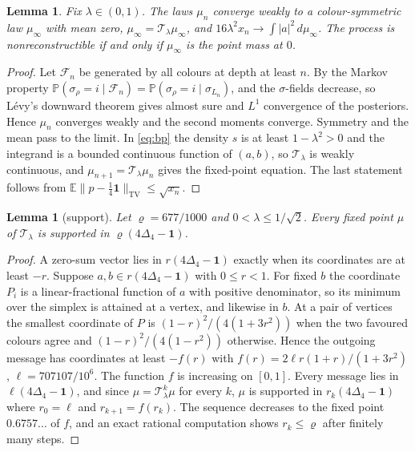 \documentclass[11pt]{amsart}
\newtheorem{lemma}[theorem]{Lemma}
\theoremstyle{definition}
\theoremstyle{remark}
\newcommand{\E}{\mathbb{E}}
\newcommand{\Simp}{\Delta_4}
\newcommand{\one}{\mathbf{1}}
\begin{document}
\begin{lemma}\label{lem:fixed}
Fix $\lambda\in(0,1)$. The laws $\mu_n$ converge weakly to a colour-symmetric law $\mu_\infty$ with
mean zero, $\mu_\infty=\mathcal T_\lambda\mu_\infty$, and $16\lambda^2x_n\to\int|a|^2\,d\mu_\infty$.
The process is nonreconstructible if and only if $\mu_\infty$ is the point mass at $0$.
\end{lemma}

\begin{proof}
Let $\mathcal F_n$ be generated by all colours at depth at least $n$. By the Markov property
$\mathbb P(\sigma_\rho=i\mid\mathcal F_n)=\mathbb P(\sigma_\rho=i\mid\sigma_{L_n})$, and the
$\sigma$-fields decrease, so L\'evy's downward theorem gives almost sure and $L^1$ convergence of the
posteriors. Hence $\mu_n$ converges weakly and the second moments converge. Symmetry and the mean pass
to the limit. In \eqref{eq:bp} the density $s$ is at least $1-\lambda^2>0$ and the integrand is a
bounded continuous function of $(a,b)$, so $\mathcal T_\lambda$ is weakly continuous, and
$\mu_{n+1}=\mathcal T_\lambda\mu_n$ gives the fixed-point equation. The last statement follows from
$\E\|p-\tfrac14\one\|_{\mathrm{TV}}\le\sqrt{x_n}$.
\end{proof}

\begin{lemma}[support]\label{lem:support}
Let $\varrho=677/1000$ and $0<\lambda\le1/\sqrt2$. Every fixed point $\mu$ of $\mathcal T_\lambda$ is
supported in $\varrho(4\Simp-\one)$.
\end{lemma}

\begin{proof}
A zero-sum vector lies in $r(4\Simp-\one)$ exactly when its coordinates are at least $-r$. Suppose
$a,b\in r(4\Simp-\one)$ with $0\le r<1$. For fixed $b$ the coordinate $P_i$ is a linear-fractional
function of $a$ with positive denominator, so its minimum over the simplex is attained at a vertex,
and likewise in $b$. At a pair of vertices the smallest coordinate of $P$ is $(1-r)^2/(4(1+3r^2))$ when
the two favoured colours agree and $(1-r)^2/(4(1-r^2))$ otherwise. Hence the outgoing message has
coordinates at least $-f(r)$ with $f(r)=2\ell r(1+r)/(1+3r^2)$, $\ell=707107/10^6$. The function $f$ is
increasing on $[0,1]$. Every message lies in $\ell(4\Simp-\one)$, and since $\mu=\mathcal T_\lambda^k\mu$
for every $k$, $\mu$ is supported in $r_k(4\Simp-\one)$ where $r_0=\ell$ and $r_{k+1}=f(r_k)$. The
sequence decreases to the fixed point $0.6757\ldots$ of $f$, and an exact rational computation shows
$r_k\le\varrho$ after finitely many steps.
\end{proof}
\end{document}
